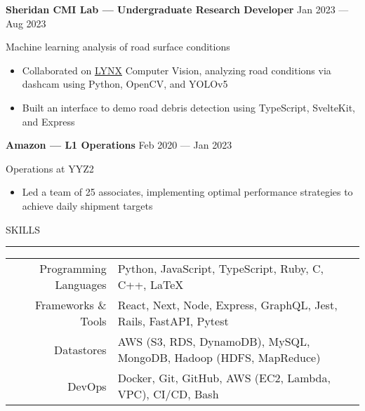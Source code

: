 \documentclass[9pt]{extarticle}
\begin{document}
\begin{adjustwidth}{10pt}{10pt}
	\vspace{-5pt}

	\textcolor{imptextblack}{\textbf{\large Sheridan CMI Lab — Undergraduate Research Developer}} \hfill Jan 2023 — Aug 2023
	
	Machine learning analysis of road surface conditions
	
	\begin{itemize}[topsep=0pt, labelsep=10pt, leftmargin=24pt, label=\textcolor{imptextblack}{\textbullet}]
		\item Collaborated on \href{https://github.com/Lynx-Data-Processing}{LYNX} Computer Vision, analyzing road conditions via dashcam using Python, OpenCV, and YOLOv5
		\item Built an interface to demo road debris detection using TypeScript, SvelteKit, and Express
	\end{itemize}
	
	\vspace{5pt}
	\textcolor{imptextblack}{\textbf{\large Amazon — L1 Operations}} \hfill Feb 2020 — Jan 2023
	
	Operations at YYZ2
	
	\begin{itemize}[topsep=0pt, labelsep=10pt, leftmargin=24pt, label=\textcolor{imptextblack}{\textbullet}]
		\item Led a team of \textcolor{imptextblack}{25} associates, implementing optimal performance strategies to achieve daily shipment targets
	\end{itemize}
\end{adjustwidth}


\vspace{5pt}

\begin{adjustwidth}{4pt}{4pt} \large \textrm{SKILLS} \end{adjustwidth}
\rule[8pt]{\linewidth}{0.4pt}

\begin{adjustwidth}{10pt}{10pt}
	\vspace{-4pt}

	\begin{tabular}{ r l }
	 	\textcolor{imptextblack}{Programming Languages} & Python, JavaScript, TypeScript, Ruby, C, C++, \textrm{\LaTeX} \\ 
	 	\textcolor{imptextblack}{Frameworks \& Tools} & React, Next, Node, Express, GraphQL, Jest, Rails, FastAPI, Pytest \\  
	 	\textcolor{imptextblack}{Datastores} & AWS ({\small S3, RDS, DynamoDB}), MySQL, MongoDB, Hadoop ({\small HDFS, MapReduce}) \\  
	 	\textcolor{imptextblack}{DevOps} & Docker, Git, GitHub, AWS ({\small EC2, Lambda, VPC}), CI/CD, Bash \\  
	\end{tabular}
\end{adjustwidth}
\end{document}
